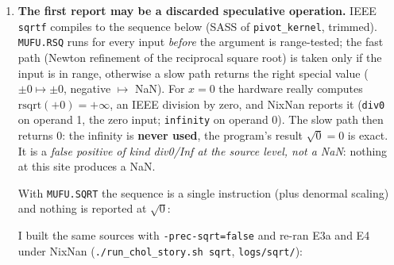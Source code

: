 \documentclass[11pt,a4paper]{article}
\begin{document}
\begin{enumerate}
  \item \textbf{The first report may be a discarded speculative operation.} IEEE \texttt{sqrtf} compiles to the sequence below (SASS of \texttt{pivot\_kernel}, trimmed). \texttt{MUFU.RSQ} runs for every
  input \emph{before} the argument is range-tested; the fast path (Newton refinement of the reciprocal square root) is taken only if the input is in range, otherwise a slow path returns the right special value
  ($\pm0\mapsto\pm0$, negative $\mapsto$ NaN). For $x=0$ the hardware really computes $\mathrm{rsqrt}(+0)=+\infty$, an IEEE division by zero, and NixNan reports it
  (\texttt{div0} on operand 1, the zero input; \texttt{infinity} on operand 0). The slow path then returns $0$: the infinity is \textbf{never used}, the program's result $\sqrt0=0$ is exact.
  It is a \emph{false positive of kind div0/Inf at the source level, not a NaN}: nothing at this site produces a NaN.



  With \texttt{MUFU.SQRT} the sequence is a single instruction (plus denormal scaling) and nothing is reported at $\sqrt0$:



  I built the same sources with \texttt{-prec-sqrt=false} and re-ran E3a and E4 under NixNan (\texttt{./run\_chol\_story.sh sqrt}, \texttt{logs/sqrt/}):

\begin{center}\scriptsize\end{center}


\end{enumerate}
\end{document}
